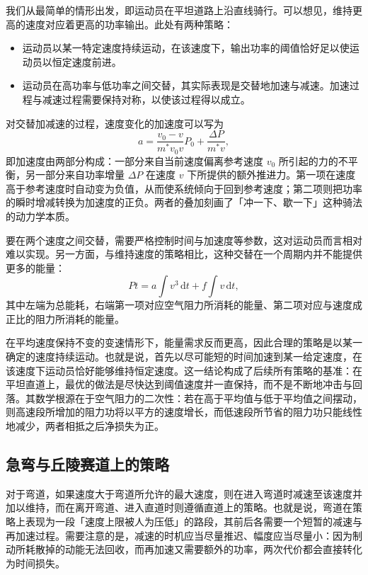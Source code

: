 \documentclass[11pt,a4paper]{ctexart}
\begin{document}
我们从最简单的情形出发，即运动员在平坦道路上沿直线骑行。可以想见，维持更高的速度对应着更高的功率输出。此处有两种策略：

\begin{itemize}
\item 运动员以某一特定速度持续运动，在该速度下，输出功率的阈值恰好足以使运动员以恒定速度前进。
\item 运动员在高功率与低功率之间交替，其实际表现是交替地加速与减速。加速过程与减速过程需要保持对称，以使该过程得以成立。
\end{itemize}

对交替加减速的过程，速度变化的加速度可以写为
\[
a=\frac{v_0-v}{m^{*}v_0 v}P_0+\frac{\Delta P}{m^{*}v},
\]
即加速度由两部分构成：一部分来自当前速度偏离参考速度 $v_0$ 所引起的力的不平衡，另一部分来自功率增量 $\Delta P$ 在速度 $v$ 下所提供的额外推进力。第一项在速度高于参考速度时自动变为负值，从而使系统倾向于回到参考速度；第二项则把功率的瞬时增减转换为加速度的正负。两者的叠加刻画了「冲一下、歇一下」这种骑法的动力学本质。

要在两个速度之间交替，需要严格控制时间与加速度等参数，这对运动员而言相对难以实现。另一方面，与维持速度的策略相比，这种交替在一个周期内并不能提供更多的能量：
\begin{equation}
Pt=a\int v^{3}\,\mathrm{d}t+f\int v\,\mathrm{d}t,
\end{equation}
其中左端为总能耗，右端第一项对应空气阻力所消耗的能量、第二项对应与速度成正比的阻力所消耗的能量。

在平均速度保持不变的变速情形下，能量需求反而更高，因此合理的策略是以某一确定的速度持续运动。也就是说，首先以尽可能短的时间加速到某一给定速度，在该速度下运动员恰好能够维持恒定速度。这一结论构成了后续所有策略的基准：在平坦直道上，最优的做法是尽快达到阈值速度并一直保持，而不是不断地冲击与回落。其数学根源在于空气阻力的二次性：若在高于平均值与低于平均值之间摆动，则高速段所增加的阻力功将以平方的速度增长，而低速段所节省的阻力功只能线性地减少，两者相抵之后净损失为正。

\subsection{急弯与丘陵赛道上的策略}

对于弯道，如果速度大于弯道所允许的最大速度，则在进入弯道时减速至该速度并加以维持，而在离开弯道、进入直道时则遵循直道上的策略。也就是说，弯道在策略上表现为一段「速度上限被人为压低」的路段，其前后各需要一个短暂的减速与再加速过程。需要注意的是，减速的时机应当尽量推迟、幅度应当尽量小：因为制动所耗散掉的动能无法回收，而再加速又需要额外的功率，两次代价都会直接转化为时间损失。
\end{document}
